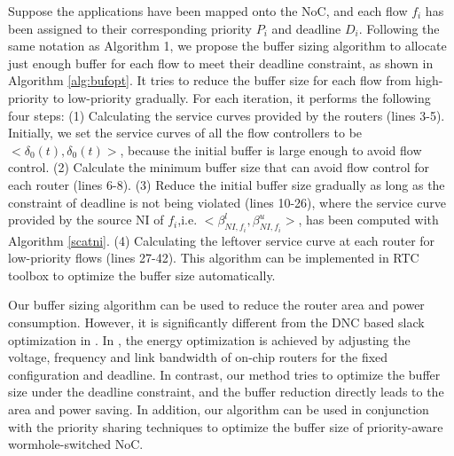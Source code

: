 \documentclass[10pt,journal]{IEEEtran}
\begin{document}
Suppose the applications have been mapped onto the NoC, and each flow $f_i$ has been assigned to their corresponding priority $P_i$ and deadline $D_i$. Following the same notation as Algorithm 1, we propose the buffer sizing algorithm to allocate just enough buffer for each flow to meet their deadline constraint, as shown in Algorithm \ref{alg:bufopt}. It tries to reduce the buffer size for each flow from high-priority to low-priority gradually. For each iteration, it performs the following four steps: (1) Calculating the service curves provided by the routers (lines 3-5). Initially, we set the service curves of all the flow controllers to be $<\delta_0(t),\delta_0(t)>$, because the initial buffer is large enough to avoid flow control. (2) Calculate the minimum buffer size that can avoid flow control for each router (lines 6-8). (3) Reduce the initial buffer size gradually as long as the constraint of deadline is not being violated (lines 10-26), where the service curve provided by the source NI of $f_i$,i.e. $<\beta_{NI,f_i}^l,\beta_{NI,f_i}^u>$, has been computed with Algorithm \ref{scatni}. (4) Calculating the leftover service curve at each router for low-priority flows (lines 27-42). This algorithm can be implemented in RTC toolbox \cite{rtc} to optimize the buffer size automatically.

Our buffer sizing algorithm can be used to reduce the router area and power consumption. However, it is significantly different from the DNC based slack optimization in \cite{6560630}. In \cite{6560630}, the energy optimization is achieved by adjusting the voltage, frequency and link bandwidth of on-chip routers for the fixed configuration and deadline. In contrast, our method tries to optimize the buffer size under the deadline constraint, and the buffer reduction directly leads to the area and power saving. In addition, our algorithm can be used in conjunction with the priority sharing techniques \cite{5161497} to optimize the buffer size of priority-aware wormhole-switched NoC.
\end{document}
